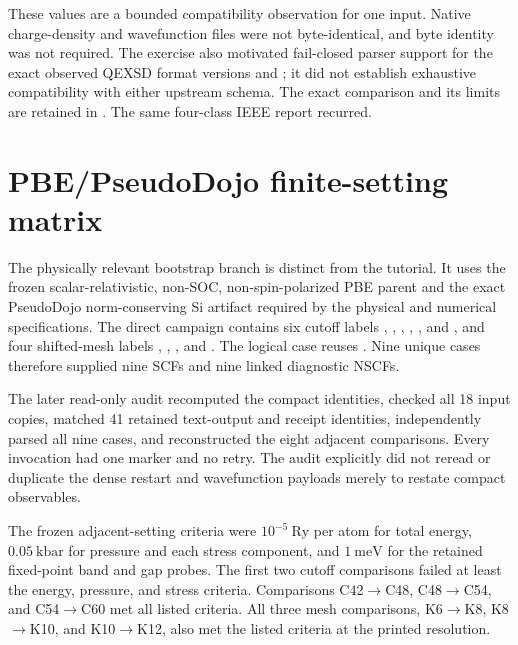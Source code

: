 These values are a bounded compatibility observation for one input. Native
charge-density and wavefunction files were not byte-identical, and byte
identity was not required. The exercise also motivated fail-closed parser
support for the exact observed QEXSD format versions  and
; it did not establish exhaustive compatibility with either
upstream schema. The exact comparison and its limits are retained in
.
The same four-class IEEE report recurred.

\section{PBE/PseudoDojo finite-setting matrix}

The physically relevant bootstrap branch is distinct from the tutorial. It
uses the frozen scalar-relativistic, non-SOC, non-spin-polarized PBE parent and
the exact PseudoDojo norm-conserving Si artifact required by the physical and
numerical specifications. The direct campaign contains six cutoff labels
, , , , , and ,
and four shifted-mesh labels , , , and
. The logical  case reuses . Nine unique cases
therefore supplied nine SCFs and nine linked diagnostic NSCFs.

The later read-only audit recomputed the compact identities, checked all 18
input copies, matched 41 retained text-output and receipt identities,
independently parsed all nine cases, and reconstructed the eight adjacent
comparisons. Every invocation had one  marker and no retry. The
audit explicitly did not reread or duplicate the dense restart and wavefunction
payloads merely to restate compact observables.

The frozen adjacent-setting criteria were $10^{-5}\ \mathrm{Ry}$ per atom for
total energy, $0.05\ \mathrm{kbar}$ for pressure and each stress component,
and $1\ \mathrm{meV}$ for the retained fixed-point band and gap probes. The
first two cutoff comparisons failed at least the energy, pressure, and stress
criteria. Comparisons C42$\rightarrow$C48, C48$\rightarrow$C54, and
C54$\rightarrow$C60 met all listed criteria. All three mesh comparisons,
K6$\rightarrow$K8, K8$\rightarrow$K10, and K10$\rightarrow$K12, also met the
listed criteria at the printed resolution.

